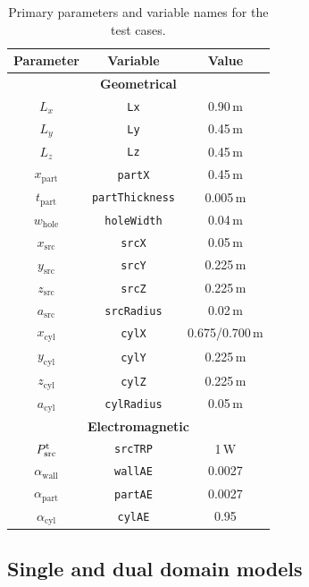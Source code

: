 \documentclass[a4paper]{article}
\numberwithin{equation}{section}
\begin{document}
\begin{table}[ht]
\begin{center}
\begin{tabular}{|c|c|c|}
\hline
\textbf{Parameter}     &\textbf{Variable}      & \textbf{Value} \\
\hline
\multicolumn{3}{|c|}{\textbf{Geometrical}} \\
\hline
$L_x$                  &\texttt{Lx}            &0.90\,m \\
$L_y$                  &\texttt{Ly}            &0.45\,m \\
$L_z$                  &\texttt{Lz}            &0.45\,m \\
$x_\mathrm{part}$      &\texttt{partX}         &0.45\,m \\
$t_\mathrm{part}$      &\texttt{partThickness} &0.005\,m \\
$w_\mathrm{hole}$      &\texttt{holeWidth}     &0.04\,m \\
$x_\mathrm{src}$       &\texttt{srcX}          &0.05\,m \\
$y_\mathrm{src}$       &\texttt{srcY}          &0.225\,m \\
$z_\mathrm{src}$       &\texttt{srcZ}          &0.225\,m \\
$a_\mathrm{src}$       &\texttt{srcRadius}     &0.02\,m \\
$x_\mathrm{cyl}$       &\texttt{cylX}          &0.675/0.700\,m \\
$y_\mathrm{cyl}$       &\texttt{cylY}          &0.225\,m \\
$z_\mathrm{cyl}$       &\texttt{cylZ}          &0.225\,m \\
$a_\mathrm{cyl}$       &\texttt{cylRadius}     &0.05\,m \\
\hline
\multicolumn{3}{|c|}{\textbf{Electromagnetic}} \\
\hline
$P^{\mathrm{t}}_\mathrm{src}$   &\texttt{srcTRP}        &1\,W \\
$\alpha_\mathrm{wall}$ &\texttt{wallAE}        &0.0027 \\
$\alpha_\mathrm{part}$ &\texttt{partAE}        &0.0027 \\
$\alpha_\mathrm{cyl}$  &\texttt{cylAE}         &0.95 \\
\hline
\end{tabular}
\end{center}
\caption{\label{tb:tcparam} Primary parameters and variable names for the test cases.}
\end{table}

\subsection[Single and dual domain models]{Single and dual domain models}
\label{sc:tcs:sddm}
\end{document}
